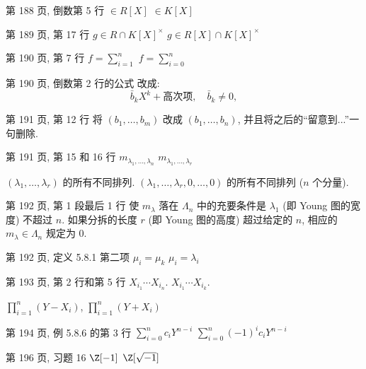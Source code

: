 \documentclass{AJerrata}
\begin{document}
\begin{Errata}
		\item[第 188 页, 倒数第 5 行]
		\Orig $\in R[X]$
		\Corr $\in K[X]$
		
		\item[第 189 页, 第 17 行]
		\Orig $g \in R \cap K[X]^\times$
		\Corr $g \in R[X] \cap K[X]^\times$
		
		\item[第 190 页, 第 7 行]
		\Orig $f = \sum_{i=1}^n$
		\Corr $f = \sum_{i=0}^n$
		
		\item[第 190 页, 倒数第 2 行的公式]
		改成:
		\[ \bar{b}_k X^k + \text{高次项}, \quad \bar{b}_k \neq 0, \]

		\item[第 191 页, 第 12 行]
		将 $(b_1, \ldots, b_m)$ 改成 $(b_1, \ldots, b_n)$, 并且将之后的``留意到...''一句删除.
		
		\item[第 191 页, 第 15 和 16 行]
		\Orig $m_{\lambda_1, \ldots, \lambda_n}$
		\Corr $m_{\lambda_1, \ldots, \lambda_r}$
		
		\Orig $(\lambda_1, \ldots, \lambda_r)$ 的所有不同排列.
		\Corr $(\lambda_1, \ldots, \lambda_r, 0, \ldots, 0)$ 的所有不同排列 ($n$ 个分量).
		
		\item[第 192 页, 第 1 段最后 1 行]
		\Orig 使 $m_\lambda$ 落在 $\Lambda_n$ 中的充要条件是 $\lambda_1$ (即 Young 图的宽度) 不超过 $n$.
		\Corr 如果分拆的长度 $r$ (即 Young 图的高度) 超过给定的 $n$, 相应的 $m_\lambda \in \Lambda_n$ 规定为 $0$.
		
		\item[第 192 页, 定义 5.8.1 第二项]
		\Orig $\mu_i = \mu_k$
		\Corr $\mu_i = \lambda_i$
		
		\item[第 193 页, 第 2 行和第 5 行]
		\Orig $X_{i_1} \cdots X_{i_n}$.
		\Corr $X_{i_1} \cdots X_{i_k}$.
		
		\Orig $\prod_{i=1}^n (Y - X_i)$,
		\Corr $\prod_{i=1}^n (Y + X_i)$
				
		\item[第 194 页, 例 5.8.6 的第 3 行]
		\Orig $\sum_{i=0}^n c_i Y^{n-i}$
		\Corr $\sum_{i=0}^n (-1)^i c_i Y^{n-i}$
		
		\item[第 196 页, 习题 16]
		\Orig $\Z[-1]$
		\Corr $\Z[\sqrt{-1}]$
		

\end{Errata}
\end{document}
